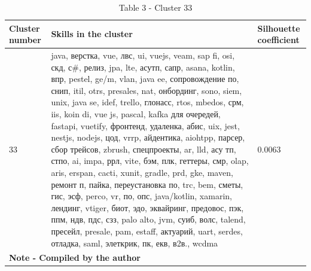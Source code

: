 \begin{table}[H]
\caption*{Table 3 - Cluster 33}
\centering
\begin{tabular}{|p{}lp{}|}
\hline
\multicolumn{1}{|p{0.1\textwidth}|}{\textbf{Cluster number}} &
  \multicolumn{1}{l|}{\textbf{Skills in the cluster}} &
  \textbf{Silhouette coefficient} \\ \hline
\multicolumn{1}{|l|}{33} &
  \multicolumn{1}{p{0.7\textwidth}|}{java, верстка, vue, лвс, ui, vuejs, veam, sap fi, osi, скд, с\#, релиз, jpa, lte, асутп, сапр, asana, kotlin, впр, pestel, ge/m, vlan, java ee, сопровождение по, снип, itil, otrs, presales, nat, онбординг, sono, siem, unix, java se, idef, trello, глонасс, rtos, mbedos, срм, iis, koin di, vue js, pascal, kafka для очередей, fastapi, vuetify, фронтенд, удаленка, абис, uix, jest, nestjs, nodejs, цод, vrrp, айдентика, aiohtpp, парсер, сбор трейсов, zbrush, спецпроекты, ar, lld, асу тп, стпо, ai, impa, ррл, vite, бэм, плк, геттеры, смр, olap, aris, erspan, cacti, xunit, gradle, prd, gke, maven, ремонт п, пайка, переустановка по, trc, bem, сметы, гис, эсф, perco, vr, по, опс, java/kotlin, xamarin, лендинг, vtiger, биот, эдо, эквайринг, предовос, пэк, ппм, ндв, пдс, сзз, palo alto, jvm, суиб, волс, talend, пресейл, presale, pam, estaff, актуарий, uart, serdes, отладка, saml, элеткрик, пк, екв, в2в., wcdma} &
  0.0063 \\ \hline
\multicolumn{3}{|l|}{\textbf{Note - Compiled by the author}} \\ \hline
\end{tabular}%
\end{table}

